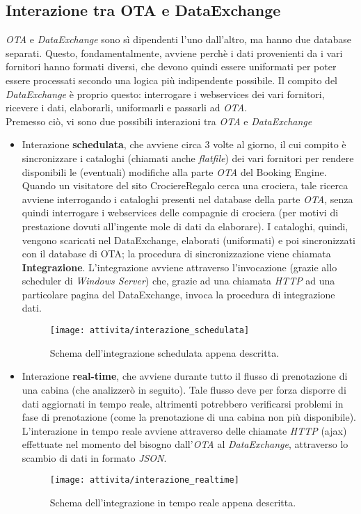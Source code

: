 \subsection{Interazione tra OTA e DataExchange}
\textit{OTA} e \textit{DataExchange} sono sì dipendenti l'uno dall'altro, ma hanno due database separati. Questo, fondamentalmente, avviene perchè i dati provenienti da i vari fornitori hanno formati diversi, che devono quindi essere uniformati per poter essere processati secondo una logica più indipendente possibile. Il compito del \textit{DataExchange} è proprio questo: interrogare i \glspl{webservice} dei vari fornitori, ricevere i dati, elaborarli, uniformarli e passarli ad \textit{OTA}.\\
Premesso ciò, vi sono due possibili interazioni tra \textit{OTA} e \textit{DataExchange}
\begin{itemize}
	\item Interazione \textbf{schedulata}, che avviene circa 3 volte al giorno, il cui compito è sincronizzare i cataloghi (chiamati anche \textit{flatfile}) dei vari fornitori per rendere disponibili le (eventuali) modifiche alla parte \textit{OTA} del Booking Engine. \\Quando un visitatore del sito CrociereRegalo cerca una crociera, tale ricerca avviene interrogando i cataloghi presenti nel database della parte \textit{OTA}, senza quindi interrogare i \glspl{webservice} delle compagnie di crociera (per motivi di prestazione dovuti all'ingente mole di dati da elaborare). I cataloghi, quindi, vengono scaricati nel DataExchange, elaborati (uniformati) e poi sincronizzati con il database di OTA; la procedura di sincronizzazione viene chiamata \textbf{Integrazione}. L'integrazione avviene attraverso l'invocazione (grazie allo scheduler di \textit{Windows Server}) che, grazie ad una chiamata \textit{HTTP} ad una particolare pagina del DataExchange, invoca la procedura di integrazione dati.
	\begin{figure}[!h] 
		\centering 
		\texttt{[image: attivita/interazione\_schedulata]} 
		\caption{Schema dell'integrazione schedulata appena descritta.}
	\end{figure}
	\item Interazione \textbf{real-time}, che avviene durante tutto il flusso di prenotazione di una cabina (che analizzerò in seguito). Tale flusso deve per forza disporre di dati aggiornati in tempo reale, altrimenti potrebbero verificarsi problemi in fase di prenotazione (come la prenotazione di una cabina non più disponibile). L'interazione in tempo reale avviene attraverso delle chiamate \textit{HTTP} (ajax) effettuate nel momento del bisogno dall'\textit{OTA} al \textit{DataExchange}, attraverso lo scambio di dati in formato \textit{JSON}.
	\begin{figure}[!h] 
		\centering 
		\texttt{[image: attivita/interazione\_realtime]} 
		\caption{Schema dell'integrazione in tempo reale appena descritta.}
	\end{figure}
\end{itemize}

